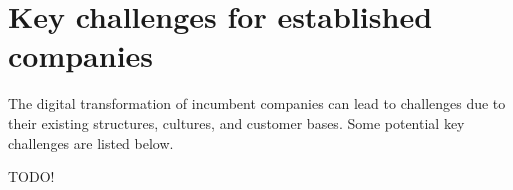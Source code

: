 \documentclass[a4]{scrartcl}
\begin{document}
	







\newpage
\section{Key challenges for established companies} \label{sec:Sec2}
	
	The digital transformation of incumbent companies can lead to challenges due to their existing structures, cultures, and customer bases. Some potential key challenges are listed below.
	
	TODO!
	
\end{document}

